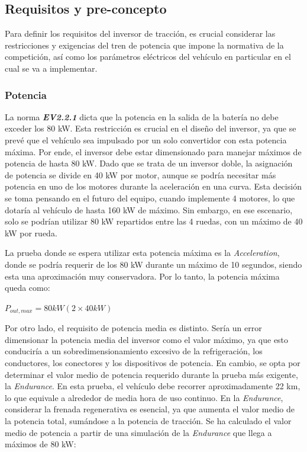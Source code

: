 \subsection{Requisitos y pre-concepto}

Para definir los requisitos del inversor de tracción, es crucial considerar las restricciones y exigencias del tren de potencia que impone la normativa de la competición, así como los parámetros eléctricos del vehículo en particular en el cual se va a implementar.

\subsubsection{Potencia}
La norma \textit{\textbf{EV2.2.1}} dicta que la potencia en la salida de la batería no debe exceder los 80 kW. Esta restricción es crucial en el diseño del inversor, ya que se prevé que el vehículo sea impulsado por un solo convertidor con esta potencia máxima. Por ende, el inversor debe estar dimensionado para manejar máximos de potencia de hasta 80 kW. Dado que se trata de un inversor doble, la asignación de potencia se divide en 40 kW por motor, aunque se podría necesitar más potencia en uno de los motores durante la aceleración en una curva. Esta decisión se toma pensando en el futuro del equipo, cuando implemente 4 motores, lo que dotaría al vehículo de hasta 160 kW de máximo. Sin embargo, en ese escenario, solo se podrían utilizar 80 kW repartidos entre las 4 ruedas, con un máximo de 40 kW por rueda.

La prueba donde se espera utilizar esta potencia máxima es la \textit{Acceleration}, donde se podría requerir de los 80 kW durante un máximo de 10 segundos, siendo esta una aproximación muy conservadora. Por lo tanto, la potencia máxima queda como:

\(P_{out, max} = 80 kW (2 \times 40 kW)\)


Por otro lado, el requisito de potencia media es distinto. Sería un error dimensionar la potencia media del inversor como el valor máximo, ya que esto conduciría a un sobredimensionamiento excesivo de la refrigeración, los conductores, los conectores y los dispositivos de potencia. En cambio, se opta por determinar el valor medio de potencia requerido durante la prueba más exigente, la \textit{Endurance}. En esta prueba, el vehículo debe recorrer aproximadamente 22 km, lo que equivale a alrededor de media hora de uso continuo. En la \textit{Endurance}, considerar la frenada regenerativa es esencial, ya que aumenta el valor medio de la potencia total, sumándose a la potencia de tracción. Se ha calculado el valor medio de potencia a partir de una simulación de la \textit{Endurance} que llega a máximos de 80 kW:

